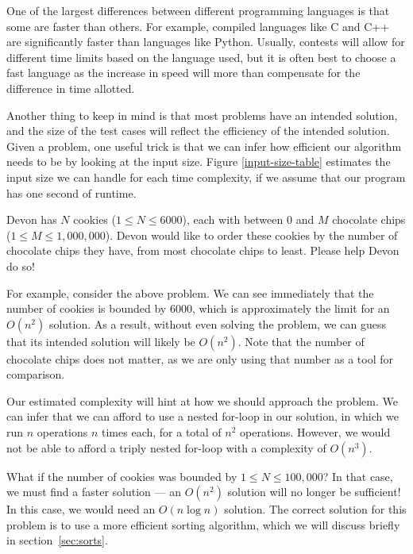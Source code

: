 One of the largest differences between different programming languages is that some are faster than others.  For example, compiled languages like C and C++ are significantly faster than languages like Python.  Usually, contests will allow for different time limits based on the language used, but it is often best to choose a fast language as the increase in speed will more than compensate for the difference in time allotted.

Another thing to keep in mind is that most problems have an intended solution, and the size of the test cases will reflect the efficiency of the intended solution. Given a problem, one useful trick is that we can infer how efficient our algorithm needs to be by looking at the input size. Figure \ref{input-size-table} estimates the input size we can handle for each time complexity, if we assume that our program has one second of runtime.


\begin{Problem}
Devon has $ N $ cookies ($ 1 \leq N \leq 6000 $), each with between $ 0 $ and $ M $ chocolate chips ($ 1 \leq M \leq 1,000,000 $).  Devon would like to order these cookies by the number of chocolate chips they have, from most chocolate chips to least.  Please help Devon do so!
\end{Problem}

For example, consider the above problem. We can see immediately that the number of cookies is bounded by $ 6000 $, which is approximately the limit for an $ O(n^2) $ solution. As a result, without even solving the problem, we can guess that its intended solution will likely be $ O(n^2) $. Note that the number of chocolate chips does not matter, as we are only using that number as a tool for comparison.

Our estimated complexity will hint at how we should approach the problem. We can infer that we can afford to use a nested for-loop in our solution, in which we run $ n $ operations $ n $ times each, for a total of $ n^2 $ operations. However, we would not be able to afford a triply nested for-loop with a complexity of $ O(n^3) $.

What if the number of cookies was bounded by $ 1 \leq N \leq 100,000 $?  In that case, we must find a faster solution --- an $ O(n^2) $ solution will no longer be sufficient! In this case, we would need an $ O(n\log n) $ solution.  The correct solution for this problem is to use a more efficient sorting algorithm, which we will discuss briefly in section~\ref{sec:sorts}.

